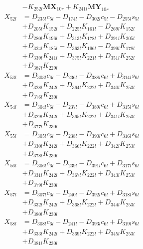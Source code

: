 \begin{multicols}{2}
\begin{align}
&- K_{252l}\mathbf{MX}_{10r} + K_{241l}\mathbf{MY}_{10r} \nonumber \\
X_{52l} &= D_{235l}c_{5l} - D_{174l} - D_{302l}c_{5l} - D_{255l}s_{5l}  \nonumber \\
&+ D_{205l}K_{152l} + D_{225l}K_{161l} - D_{269l}K_{152l}  \nonumber \\
&+ D_{280l}K_{196l} + D_{313l}K_{178l} + D_{291l}K_{205l}  \nonumber \\
&+ D_{324l}K_{185l} - D_{363l}K_{196l} - D_{399l}K_{178l}  \nonumber \\
&+ D_{339l}K_{241l} + D_{375l}K_{221l} + D_{351l}K_{252l}  \nonumber \\
&+ D_{387l}K_{229l} \nonumber \\
X_{53l} &= D_{303l}c_{6l} - D_{236l} - D_{388l}c_{6l} + D_{314l}s_{6l}  \nonumber \\
&+ D_{328l}K_{242l} + D_{364l}K_{222l} + D_{340l}K_{253l}  \nonumber \\
&+ D_{376l}K_{230l} \nonumber \\
X_{54l} &= D_{304l}c_{6l} - D_{237l} - D_{389l}c_{6l} + D_{315l}s_{6l}  \nonumber \\
&+ D_{329l}K_{242l} + D_{365l}K_{222l} + D_{341l}K_{253l}  \nonumber \\
&+ D_{377l}K_{230l} \nonumber \\
X_{55l} &= D_{305l}c_{6l} - D_{238l} - D_{390l}c_{6l} + D_{316l}s_{6l}  \nonumber \\
&+ D_{330l}K_{242l} + D_{366l}K_{222l} + D_{342l}K_{253l}  \nonumber \\
&+ D_{378l}K_{230l} \nonumber \\
X_{56l} &= D_{306l}c_{6l} - D_{239l} - D_{391l}c_{6l} + D_{317l}s_{6l}  \nonumber \\
&+ D_{331l}K_{242l} + D_{367l}K_{222l} + D_{343l}K_{253l}  \nonumber \\
&+ D_{379l}K_{230l} \nonumber \\
X_{57l} &= D_{307l}c_{6l} - D_{240l} - D_{392l}c_{6l} + D_{318l}s_{6l}  \nonumber \\
&+ D_{332l}K_{242l} + D_{368l}K_{222l} + D_{344l}K_{253l}  \nonumber \\
&+ D_{380l}K_{230l} \nonumber \\
X_{58l} &= D_{308l}c_{6l} - D_{241l} - D_{393l}c_{6l} + D_{319l}s_{6l}  \nonumber \\
&+ D_{333l}K_{242l} + D_{369l}K_{222l} + D_{345l}K_{253l}  \nonumber \\
&+ D_{381l}K_{230l} \nonumber \\

\end{align}
\end{multicols}
